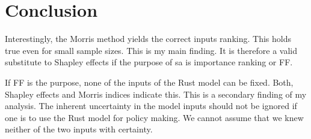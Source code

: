 \section{Conclusion} \label{conclusion}

Interestingly, the Morris method yields the correct inputs ranking. This holds true even for small sample sizes. This is my main finding. It is therefore a valid substitute to Shapley effects if the purpose of sa is importance ranking or FF.

If FF is the purpose, none of the inputs of the Rust model can be fixed. Both, Shapley effects and Morris indices indicate this. This is a secondary finding of my analysis. The inherent uncertainty in the model inputs should not be ignored if one is to use the Rust model for policy making. We cannot assume that we knew neither of the two inputs with certainty.